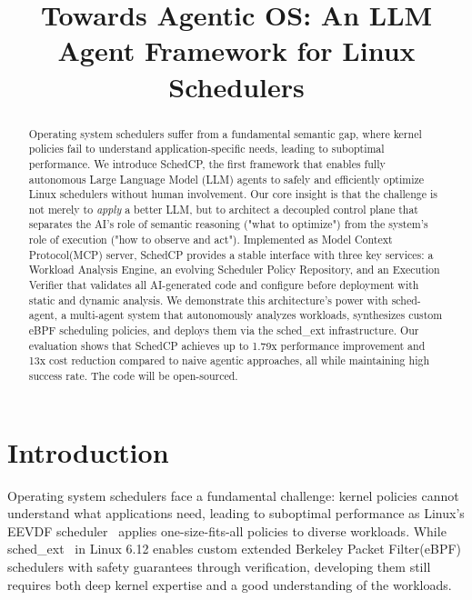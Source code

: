\documentclass[preprint]{article}
\title{Towards Agentic OS: An LLM Agent Framework for Linux Schedulers}
\newcommand{\sys}{SchedCP\xspace}
\newcommand{\agent}{sched-agent\xspace}
\begin{document}
\maketitle


\begin{abstract}
Operating system schedulers suffer from a fundamental semantic gap, where kernel policies fail to understand application-specific needs, leading to suboptimal performance. We introduce \sys, the first framework that enables fully autonomous Large Language Model (LLM) agents to safely and efficiently optimize Linux schedulers without human involvement. Our core insight is that the challenge is not merely to \emph{apply} a better LLM, but to architect a decoupled control plane that separates the AI's role of semantic reasoning ("what to optimize") from the system's role of execution ("how to observe and act"). Implemented as Model Context Protocol(MCP) server, \sys provides a stable interface with three key services: a Workload Analysis Engine, an evolving Scheduler Policy Repository, and an Execution Verifier that validates all AI-generated code and configure before deployment with static and dynamic analysis. We demonstrate this architecture's power with \agent, a multi-agent system that autonomously analyzes workloads, synthesizes custom eBPF scheduling policies, and deploys them via the sched\_ext infrastructure. Our evaluation shows that SchedCP achieves up to 1.79x performance improvement and 13x cost reduction compared to naive agentic approaches, all while maintaining high success rate. The code will be open-sourced.
\end{abstract}



\maketitle
\section{Introduction}
\label{sec:intro}

Operating system schedulers face a fundamental challenge: kernel policies cannot understand what applications need, leading to suboptimal performance as Linux's EEVDF scheduler~\cite{eevdf2024} applies one-size-fits-all policies to diverse workloads. While sched\_ext~\cite{schedext2024} in Linux 6.12 enables custom extended Berkeley Packet Filter(eBPF) schedulers with safety guarantees through verification, developing them still requires both deep kernel expertise and a good understanding of the workloads.
\end{document}
